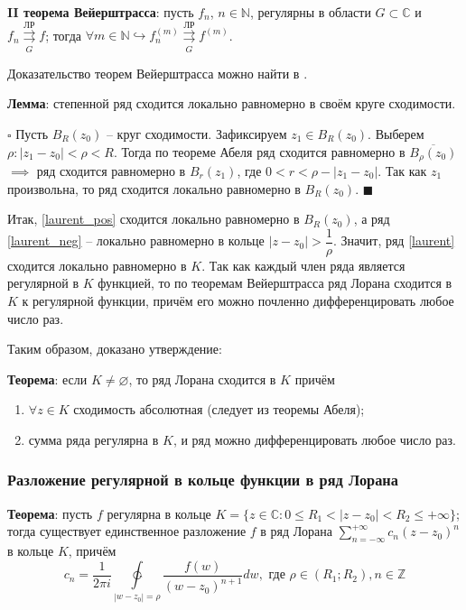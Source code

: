 \documentclass[12pt, a4paper, reqno]{article}
\begin{document}
    \textbf{II теорема Вейерштрасса}: пусть $f_n$, $n \in \mathbb{N}$, регулярны в области
    $G \subset \mathbb{C}$ и $f_n \overset{\text{ЛР}}{\underset{G}{\rightrightarrows}} f$; тогда
    $\forall m \in \mathbb{N} \hookrightarrow
    f_n^{(m)} \overset{\text{ЛР}}{\underset{G}{\rightrightarrows}} f^{(m)}$.

    Доказательство теорем Вейерштрасса можно найти в \cite{bunakov}.

    \textbf{Лемма}: степенной ряд сходится локально равномерно в своём круге сходимости.

    $\square$
    Пусть $B_R(z_0)$ -- круг сходимости. Зафиксируем $z_1 \in B_R(z_0)$. Выберем
    $\rho: |z_1 - z_0| < \rho < R$. Тогда по теореме Абеля ряд сходится равномерно в
    $\overline{B_{\rho}(z_0)}$ $\implies$ ряд сходится равномерно в $B_r(z_1)$, где
    $0 < r < \rho - |z_1 - z_0|$. Так как $z_1$ произвольна, то ряд сходится локально равномерно в
    $B_R(z_0)$.
    $\blacksquare$

    Итак, \eqref{laurent_pos} сходится локально равномерно в $B_R(z_0)$, а ряд \eqref{laurent_neg} --
    локально равномерно в кольце $|z - z_0| > \dfrac{1}{\rho}$. Значит, ряд \eqref{laurent} сходится
    локально равномерно в $K$. Так как каждый член ряда является регулярной в $K$ функцией, то по
    теоремам Вейерштрасса ряд Лорана сходится в $K$ к регулярной функции, причём его можно почленно
    дифференцировать любое число раз.

    Таким образом, доказано утверждение:

    \textbf{Теорема}: если $K \neq \varnothing$, то ряд Лорана сходится в $K$ причём
    \begin{enumerate}
        \item $\forall z \in K$ сходимость абсолютная (следует из теоремы Абеля);
        \item сумма ряда регулярна в $K$, и ряд можно дифференцировать любое число раз.
    \end{enumerate}

    \subsubsection{Разложение регулярной в кольце функции в ряд Лорана}

    \textbf{Теорема}: пусть $f$ регулярна в кольце $K = \{z \in \mathbb{C}: 0 \leq R_1 < |z - z_0| < R_2
    \leq +\infty\}$; тогда существует единственное разложение $f$ в ряд Лорана
    $\sum\limits_{n = -\infty}^{+\infty} c_n (z - z_0)^n$ в кольце $K$, причём
    \begin{equation*}
        c_n = \frac{1}{2\pi i} \ointctrclockwise \limits_{|w - z_0| = \rho}
        \frac{f(w)}{(w - z_0)^{n + 1}}dw,\text{ где }\rho \in (R_1; R_2), n \in \mathbb{Z}
    \end{equation*}
\end{document}
